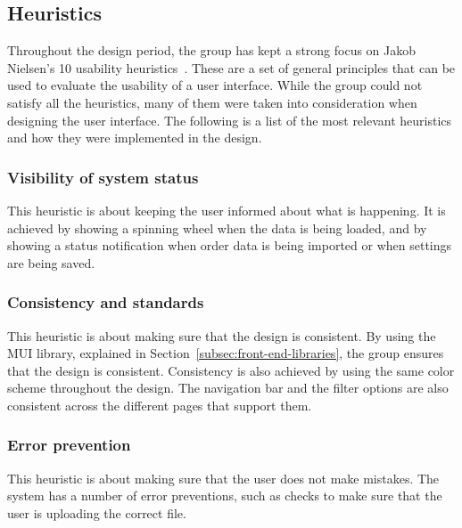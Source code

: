
\subsection{Heuristics}\label{sec:heuristics}

Throughout the design period, the group has kept a strong focus on Jakob Nielsen's 10 usability
heuristics~\cite{usability-heuristics}.
These are a set of general principles that can be used to evaluate the usability of a user interface.
While the group could not satisfy all the heuristics, many of them were taken into consideration when designing the
user interface.
The following is a list of the most relevant heuristics and how they were implemented in the design.

\subsubsection{Visibility of system status}\label{subsubsec:visibility-of-system-status}

This heuristic is about keeping the user informed about what is happening.
It is achieved by showing a spinning wheel when the data is being loaded, and by showing a status notification
when order data is being imported or when settings are being saved.

\subsubsection{Consistency and standards}\label{subsubsec:consistency-and-standards}

This heuristic is about making sure that the design is consistent.
By using the MUI library, explained in Section~\ref{subsec:front-end-libraries}, the group ensures that the design is
consistent.
Consistency is also achieved by using the same color scheme throughout the design.
The navigation bar and the filter options are also consistent across the different pages that support them.

\subsubsection{Error prevention}\label{subsubsec:error-prevention}

This heuristic is about making sure that the user does not make mistakes.
The system has a number of error preventions, such as checks to make sure that the user is uploading the correct file.

